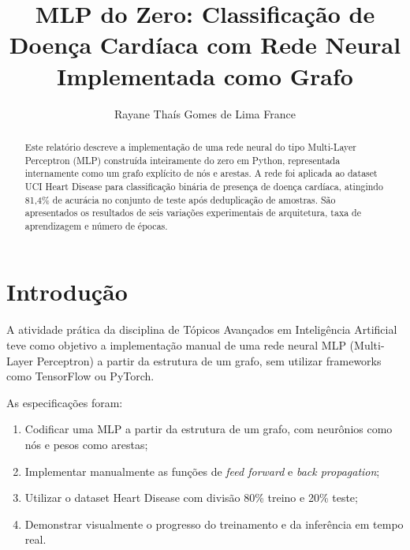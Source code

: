 \documentclass[runningheads]{llncs}
\begin{document}
\title{MLP do Zero: Classificação de Doença Cardíaca com Rede Neural
Implementada como Grafo}

\author{Rayane Thaís Gomes de Lima France}



\maketitle

\begin{abstract}
Este relatório descreve a implementação de uma rede neural do tipo
Multi-Layer Perceptron (MLP) construída inteiramente do zero em Python,
representada internamente como um grafo explícito de nós e arestas.
A rede foi aplicada ao dataset UCI Heart Disease para classificação
binária de presença de doença cardíaca, atingindo 81,4\% de acurácia
no conjunto de teste após deduplicação de amostras. São apresentados
os resultados de seis variações experimentais de arquitetura,
taxa de aprendizagem e número de épocas.

\end{abstract}

\section{Introdução}

A atividade prática da disciplina de Tópicos Avançados em Inteligência
Artificial teve como objetivo a implementação manual de uma rede neural
MLP (Multi-Layer Perceptron) a partir da estrutura de um grafo, sem
utilizar frameworks como TensorFlow ou PyTorch.

As especificações foram:
\begin{enumerate}
    \item Codificar uma MLP a partir da estrutura de um grafo, com
          neurônios como nós e pesos como arestas;
    \item Implementar manualmente as funções de \textit{feed forward}
          e \textit{back propagation};
    \item Utilizar o dataset Heart Disease com divisão 80\% treino
          e 20\% teste;
    \item Demonstrar visualmente o progresso do treinamento e da
          inferência em tempo real.
\end{enumerate}
\end{document}
